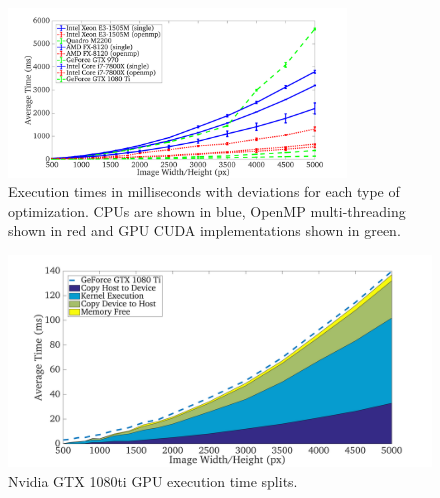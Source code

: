 \documentclass{article}
\begin{document}
\begin{figure}[H]
\centering
\includegraphics[width=0.8\textwidth]{fig_results/plot_times_type.png}
\caption{Execution times in milliseconds with deviations for each type of optimization. CPUs are shown in blue, OpenMP multi-threading shown in red and GPU CUDA implementations shown in green.}
\end{figure}


\begin{figure}[H]%
    \centering
    \qquad
\end{figure}

\begin{figure}[H]
\centering
\includegraphics[width=0.45\linewidth]{fig_results/plot_gpusplit_3_GTX1080ti.png}
\caption{Nvidia GTX 1080ti GPU execution time splits.}
\end{figure}
\end{document}
